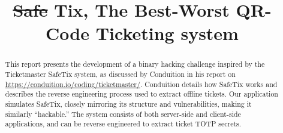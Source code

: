 \documentclass[conference,dvipsnames]{IEEEtran}
\newcommand{\soutthick}[1]{%
    \renewcommand{\ULthickness}{3pt}%
       \sout{#1}%
    \renewcommand{\ULthickness}{.3pt}%
}
\begin{document}
\title{\soutthick{Safe}Tix, The Best-Worst QR-Code Ticketing system}

\author{
}

\maketitle

\begin{abstract}
  This report presents the development of a binary hacking challenge inspired by the Ticketmaster SafeTix system, 
  as discussed by Conduition in his report on \url{https://conduition.io/coding/ticketmaster/}. 
  Conduition details how SafeTix works and describes the reverse engineering process used to extract offline tickets. 
  Our application simulates SafeTix, closely mirroring its structure and vulnerabilities, making it similarly “hackable.” 
  The system consists of both server-side and client-side applications, and can be reverse engineered to extract ticket TOTP secrets.

\end{abstract}









\clearpage
%
\end{document}
